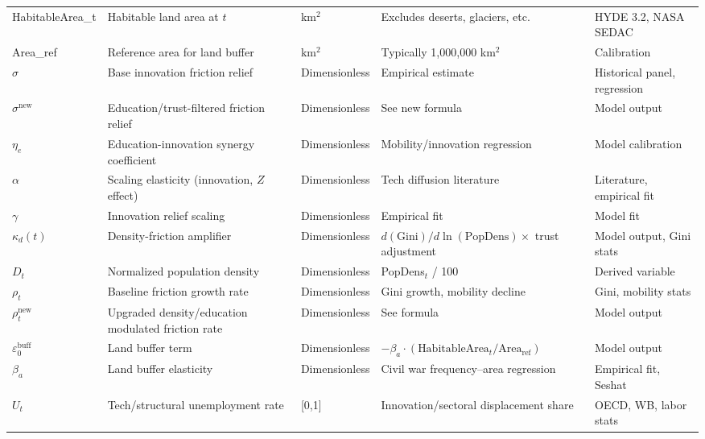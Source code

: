 \documentclass[12pt]{report}
\begin{document}
\begin{longtable}{|p{2.8cm}|p{4.3cm}|p{2.0cm}|p{3.0cm}|p{3.0cm}|}
HabitableArea\_t & Habitable land area at $t$ & km$^2$ & Excludes deserts, glaciers, etc. & HYDE 3.2, NASA SEDAC \\
Area\_ref & Reference area for land buffer & km$^2$ & Typically 1,000,000 km$^2$ & Calibration \\
$\sigma$ & Base innovation friction relief & Dimensionless & Empirical estimate & Historical panel, regression \\
$\sigma^{\text{new}}$ & Education/trust-filtered friction relief & Dimensionless & See new formula & Model output \\
$\eta_e$ & Education-innovation synergy coefficient & Dimensionless & Mobility/innovation regression & Model calibration \\
$\alpha$ & Scaling elasticity (innovation, $Z$ effect) & Dimensionless & Tech diffusion literature & Literature, empirical fit \\
$\gamma$ & Innovation relief scaling & Dimensionless & Empirical fit & Model fit \\
$\kappa_d(t)$ & Density-friction amplifier & Dimensionless & $d(\text{Gini})/d\ln(\text{PopDens}) \times$ trust adjustment & Model output, Gini stats \\
$D_t$ & Normalized population density & Dimensionless & PopDens$_t$ / 100 & Derived variable \\
$\rho_t$ & Baseline friction growth rate & Dimensionless & Gini growth, mobility decline & Gini, mobility stats \\
$\rho_t^{\text{new}}$ & Upgraded density/education modulated friction rate & Dimensionless & See formula & Model output \\
$\varepsilon_0^{\text{buff}}$ & Land buffer term & Dimensionless & $-\beta_a \cdot (\text{HabitableArea}_t / \text{Area}_\text{ref})$ & Model output \\
$\beta_a$ & Land buffer elasticity & Dimensionless & Civil war frequency–area regression & Empirical fit, Seshat \\
$U_t$ & Tech/structural unemployment rate & [0,1] & Innovation/sectoral displacement share & OECD, WB, labor stats \\

\end{longtable}
\end{document}
